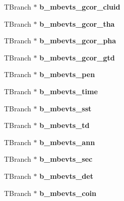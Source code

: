 \begin{DoxyCompactItemize}
T\+Branch $\ast$ {\bfseries b\+\_\+mbevts\+\_\+gcor\+\_\+cluid}
\item 
\mbox{\label{classg__clx_a0f7d93d1fa74494fe37cb9ed267ba772}} 
T\+Branch $\ast$ {\bfseries b\+\_\+mbevts\+\_\+gcor\+\_\+tha}
\item 
\mbox{\label{classg__clx_a7a083db76444664d6de969b4d2bc3f4c}} 
T\+Branch $\ast$ {\bfseries b\+\_\+mbevts\+\_\+gcor\+\_\+pha}
\item 
\mbox{\label{classg__clx_ab39c71eb90a3a8d873997427e22e7197}} 
T\+Branch $\ast$ {\bfseries b\+\_\+mbevts\+\_\+gcor\+\_\+gtd}
\item 
\mbox{\label{classg__clx_a04f798d6cf027d59cf944b8c0f09c295}} 
T\+Branch $\ast$ {\bfseries b\+\_\+mbevts\+\_\+pen}
\item 
\mbox{\label{classg__clx_ac43ee47414821ea7c50597d2539baefe}} 
T\+Branch $\ast$ {\bfseries b\+\_\+mbevts\+\_\+time}
\item 
\mbox{\label{classg__clx_a0788c96ddf563f127b260ad2d259ef80}} 
T\+Branch $\ast$ {\bfseries b\+\_\+mbevts\+\_\+sst}
\item 
\mbox{\label{classg__clx_a9b39386d9c1a2e6536fa62a70d2d169f}} 
T\+Branch $\ast$ {\bfseries b\+\_\+mbevts\+\_\+td}
\item 
\mbox{\label{classg__clx_ac6b131947020f22150d9562d519bce3f}} 
T\+Branch $\ast$ {\bfseries b\+\_\+mbevts\+\_\+ann}
\item 
\mbox{\label{classg__clx_a626c3570226a2cf9bdb2b523f1422286}} 
T\+Branch $\ast$ {\bfseries b\+\_\+mbevts\+\_\+sec}
\item 
\mbox{\label{classg__clx_a682289b20e95b369adcdf382225884a2}} 
T\+Branch $\ast$ {\bfseries b\+\_\+mbevts\+\_\+det}
\item 
\mbox{\label{classg__clx_a6f09892a8e1906c10e7f2575d41641bf}} 
T\+Branch $\ast$ {\bfseries b\+\_\+mbevts\+\_\+coin}
\item 
\mbox{\label{classg__clx_a34c3cf461751e39034565bfb9dad5a7d}} 

\end{DoxyCompactItemize}
